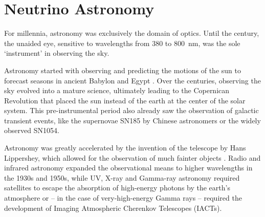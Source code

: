 \documentclass[
    a4paper, %
    fontsize=10pt, %
    twoside=false, %
    numbers=noenddot, %
    fontmethod=tex,
]{kaobook}
\begin{document}

\tableofcontents
\listoffigures

\let\cleardoublepage\bigskip
\let\clearpage\bigskip

\listoftables

\endgroup

\mainmatter
{}





\chapter{Neutrino Astronomy} \label{theory}

For millennia, astronomy was exclusively the domain of optics. Until the  century, the unaided eye, sensitive to wavelengths from \num{380} to \SI{800}{\nano\m}, was the sole `instrument'  in observing the sky.

Astronomy started with observing and predicting the motions of the sun to forecast seasons in ancient Babylon and Egypt . Over the centuries, observing the sky evolved into a mature science, ultimately leading to the Copernican Revolution that placed the sun instead of the earth at the center of the solar system. This pre-instrumental period also already saw the observation of galactic transient events, like the supernovae SN185 by Chinese astronomers or the widely observed SN1054.

Astronomy was greatly accelerated by the invention of the telescope by Hans Lippershey, which allowed for the observation of much fainter objects . Radio and infrared astronomy expanded the observational means to higher wavelengths in the 1930s and 1950s, while UV, X-ray and Gamma-ray astronomy required satellites to escape the absorption of high-energy photons by the earth's atmosphere or -- in the case of very-high-energy Gamma rays -- required the development of Imaging Atmospheric Cherenkov Telescopes (IACTs).
\end{document}
